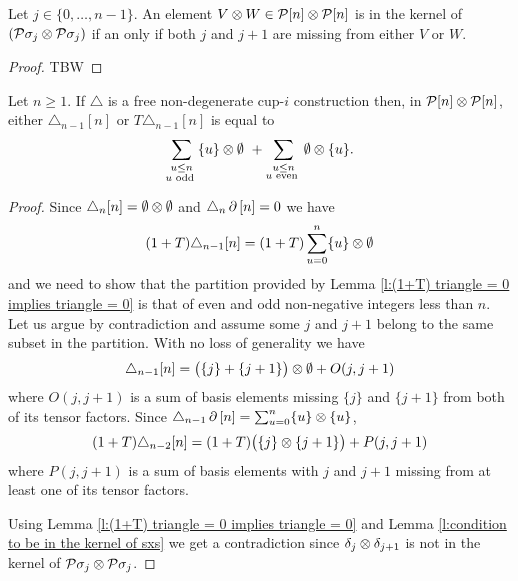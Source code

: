 \begin{lemma} \label{l:condition to be in the kernel of sxs}
	Let $j \in \{0, \dots, n-1\}$.
	An element $V \otimes W \in \mathcal{P}[n] \otimes \mathcal{P}[n]$ is in the kernel of $(\mathcal{P} \sigma_j \otimes \mathcal{P} \sigma_j)$ if an only if both $j$ and $j+1$ are missing from either $V$ or $W$.
\end{lemma}

\begin{proof}
	TBW
\end{proof}

\begin{lemma}
	Let $n \geq 1$.
	If $\triangle$ is a free non-degenerate cup-$i$ construction then, in $\mathcal{P}[n] \otimes \mathcal{P}[n]$, either $\triangle_{n-1} [n]$ or $T \triangle_{n-1} [n]$ is equal to
	\[
	\sum_{\substack{u \leq n \\ u \text{ odd }}} \{u\} \otimes \emptyset \ +
	\sum_{\substack{u \leq n \\ u \text{ even }}} \emptyset \otimes \{u\}.
	\]
\end{lemma}

\begin{proof}
	Since $\triangle_{n} [n] = \emptyset \otimes \emptyset$ and $\triangle_{n} \operatorname{\partial} \, [n] = 0$ we have
	\[
	(1+T) \triangle_{n-1} [n] = (1+T) \sum_{u=0}^n \{u\} \otimes \emptyset
	\]
	and we need to show that the partition provided by Lemma \ref{l:(1+T) triangle = 0 implies triangle = 0} is that of even and odd non-negative integers less than $n$.
	Let us argue by contradiction and assume some $j$ and $j+1$ belong to the same subset in the partition.
	With no loss of generality we have
	\[
	\triangle_{n-1} [n] = \big( \{j\} + \{j+1\} \big) \otimes \emptyset + O(j, j+1)
	\]
	where $O(j, j+1)$ is a sum of basis elements missing $\{j\}$ and $\{j+1\}$ from both of its tensor factors.
	Since $\triangle_{n-1} \operatorname{\partial} \, [n] = \sum_{u=0}^{n} \{u\} \otimes \{u\}$,
	\[
	(1+T) \triangle_{n-2} [n] = (1+T) \big( \{j\} \otimes \{j+1\} \big) + P(j, j+1)
	\]
	where $P(j, j+1)$ is a sum of basis elements with $j$ and $j+1$ missing from at least one of its tensor factors.

	Using Lemma \ref{l:(1+T) triangle = 0 implies triangle = 0} and Lemma \ref{l:condition to be in the kernel of sxs} we get a contradiction since $\delta_j \otimes \delta_{j+1}$ is not in the kernel of $\mathcal{P} \sigma_j \otimes \mathcal{P} \sigma_j$.
\end{proof}